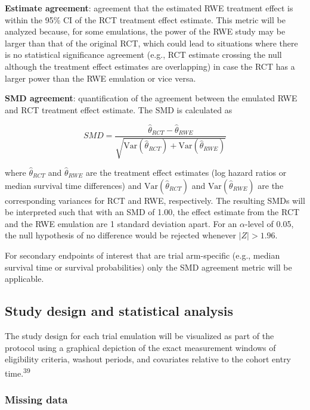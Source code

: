 \documentclass[
  letterpaper,
  DIV=11,
  numbers=noendperiod]{scrartcl}
\begin{document}
\textbf{Estimate agreement}: agreement that the estimated RWE treatment
effect is within the 95\% CI of the RCT treatment effect estimate. This
metric will be analyzed because, for some emulations, the power of the
RWE study may be larger than that of the original RCT, which could lead
to situations where there is no statistical significance agreement
(e.g., RCT estimate crossing the null although the treatment effect
estimates are overlapping) in case the RCT has a larger power than the
RWE emulation or vice versa.

\textbf{SMD agreement}: quantification of the agreement between the
emulated RWE and RCT treatment effect estimate. The SMD is calculated as

\[
SMD = \frac{\hat{\theta}_{RCT} - \hat{\theta}_{RWE}}{\sqrt{\text{Var}(\hat{\theta}_{RCT}) + \text{Var}(\hat{\theta}_{RWE})}}
\]

where \(\hat{\theta}_{RCT}\) and \(\hat{\theta}_{RWE}\) are the
treatment effect estimates (log hazard ratios or median survival time
differences) and \(\text{Var}(\hat{\theta}_{RCT})\) and
\(\text{Var}(\hat{\theta}_{RWE})\) are the corresponding variances for
RCT and RWE, respectively. The resulting SMDs will be interpreted such
that with an SMD of 1.00, the effect estimate from the RCT and the RWE
emulation are 1 standard deviation apart. For an \(\alpha\)-level of
0.05, the null hypothesis of no difference would be rejected whenever
\(|Z| > 1.96\).

For secondary endpoints of interest that are trial arm-specific (e.g.,
median survival time or survival probabilities) only the SMD agreement
metric will be applicable.

\subsection{Study design and statistical
analysis}\label{study-design-and-statistical-analysis}

The study design for each trial emulation will be visualized as part of
the protocol using a graphical depiction of the exact measurement
windows of eligibility criteria, washout periods, and covariates
relative to the cohort entry time.\textsuperscript{39}

\subsubsection{Missing data}\label{missing-data}
\end{document}
